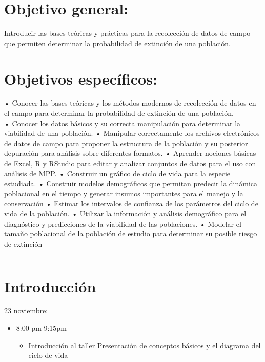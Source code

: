 \documentclass[
]{book}
\providecommand{\tightlist}{%
  \setlength{\itemsep}{0pt}\setlength{\parskip}{0pt}}
\theoremstyle{definition}
\theoremstyle{definition}
\theoremstyle{definition}
\theoremstyle{definition}
\theoremstyle{remark}
\begin{document}
\hypertarget{objetivo-general}{%
\section{Objetivo general:}\label{objetivo-general}}

Introducir las bases teóricas y prácticas para la recolección de datos
de campo que permiten determinar la probabilidad de extinción de una
población.

\hypertarget{objetivos-especuxedficos}{%
\section{Objetivos específicos:}\label{objetivos-especuxedficos}}

• Conocer las bases teóricas y los métodos modernos de recolección de
datos en el campo para determinar la probabilidad de extinción de una
población.\\
• Conocer los datos básicos y su correcta manipulación para determinar
la viabilidad de una población. • Manipular correctamente los archivos
electrónicos de datos de campo para proponer la estructura de la
población y su posterior depuración para análisis sobre diferentes
formatos. • Aprender nociones básicas de Excel, R y RStudio para editar
y analizar conjuntos de datos para el uso con análisis de MPP. •
Construir un gráfico de ciclo de vida para la especie estudiada. •
Construir modelos demográficos que permitan predecir la dinámica
poblacional en el tiempo y generar insumos importantes para el manejo y
la conservación • Estimar los intervalos de confianza de los parámetros
del ciclo de vida de la población. • Utilizar la información y análisis
demográfico para el diagnóstico y predicciones de la viabilidad de las
poblaciones. • Modelar el tamaño poblacional de la población de estudio
para determinar su posible riesgo de extinción

\begin{verbatim}
\end{verbatim}

\hypertarget{introducciuxf3n-1}{%
\section{Introducción}\label{introducciuxf3n-1}}

23 noviembre:

\begin{itemize}
\item
  8:00 pm 9:15pm

  \begin{itemize}
  \tightlist
  \item
    Introducción al taller Presentación de conceptos básicos y el
    diagrama del ciclo de vida
  \end{itemize}
\end{itemize}
\end{document}

